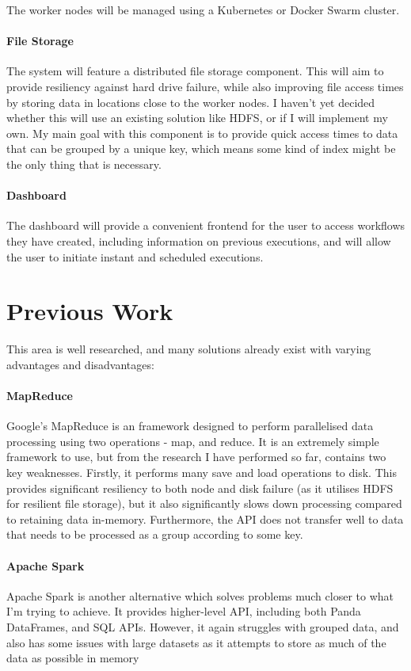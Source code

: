 \documentclass[12pt]{article}
\begin{document}
	The worker nodes will be managed using a Kubernetes or Docker Swarm cluster.
	
	\paragraph{File Storage}
	The system will feature a distributed file storage component. This will aim to provide resiliency against hard drive failure, while also improving file access times by storing data in locations close to the worker nodes. I haven't yet decided whether this will use an existing solution like HDFS, or if I will implement my own. My main goal with this component is to provide quick access times to data that can be grouped by a unique key, which means some kind of index might be the only thing that is necessary.
	
	\paragraph{Dashboard}
	The dashboard will provide a convenient frontend for the user to access workflows they have created, including information on previous executions, and will allow the user to initiate instant and scheduled executions.
	
	\section{Previous Work}

	This area is well researched, and many solutions already exist with varying advantages and disadvantages:
	
	\paragraph{MapReduce}
	Google’s MapReduce is an framework designed to perform parallelised data processing using two operations - map, and reduce. It is an extremely simple framework to use, but from the research I have performed so far, contains two key weaknesses. Firstly, it performs many save and load operations to disk. This provides significant resiliency to both node and disk failure (as it utilises HDFS for resilient file storage), but it also significantly slows down processing compared to retaining data in-memory. Furthermore, the API does not transfer well to data that needs to be processed as a group according to some key.
	
	\paragraph{Apache Spark}
	Apache Spark is another alternative which solves problems much closer to what I'm trying to achieve. It provides higher-level API, including both Panda DataFrames, and SQL APIs. However, it again struggles with grouped data, and also has some issues with large datasets as it attempts to store as much of the data as possible in memory
	
\end{document}
